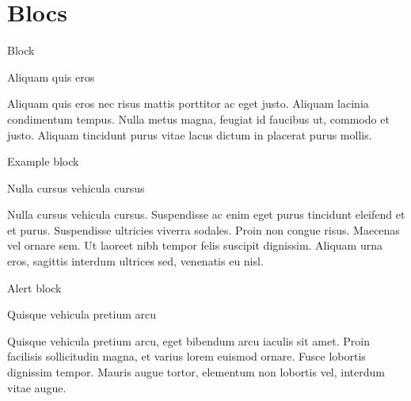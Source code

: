 \documentclass{beamer}
\begin{document}
\section{Blocs}
\begin{frame}{}
\end{frame}

\begin{frame}{Block}
  \begin{block}{Aliquam quis eros}

    Aliquam quis eros nec risus mattis porttitor ac eget justo. 
    Aliquam lacinia condimentum tempus. Nulla metus magna, feugiat 
    id faucibus ut, commodo et justo. Aliquam tincidunt purus vitae 
    lacus dictum in placerat purus mollis. 

  \end{block}
\end{frame}

\begin{frame}{Example block}
  \begin{exampleblock}{Nulla cursus vehicula cursus}


    Nulla cursus vehicula cursus. Suspendisse ac enim eget purus 
    tincidunt eleifend et et purus. Suspendisse ultricies viverra 
    sodales. Proin non congue risus. Maecenas vel ornare sem. Ut 
    laoreet nibh tempor felis suscipit dignissim. Aliquam urna 
    eros, sagittis interdum ultrices sed, venenatis eu nisl.

  \end{exampleblock}
\end{frame}

\begin{frame}{Alert block}
  \begin{alertblock}{Quisque vehicula pretium arcu}

    Quisque vehicula pretium arcu, eget bibendum arcu iaculis sit amet. 
    Proin facilisis sollicitudin magna, et varius lorem euismod ornare. 
    Fusce lobortis dignissim tempor. Mauris augue tortor, elementum non 
    lobortis vel, interdum vitae augue.

  \end{alertblock}
\end{frame}
\end{document}
